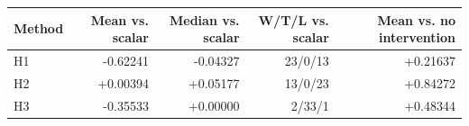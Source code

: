 \begin{tabular}{lrrrr}
\toprule
Method & Mean vs. scalar & Median vs. scalar & W/T/L vs. scalar & Mean vs. no intervention \\
\midrule
H1 & -0.62241 & -0.04327 & 23/0/13 & +0.21637 \\
H2 & +0.00394 & +0.05177 & 13/0/23 & +0.84272 \\
H3 & -0.35533 & +0.00000 & 2/33/1 & +0.48344 \\
\bottomrule
\end{tabular}
